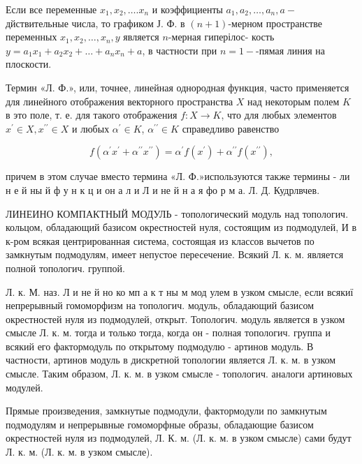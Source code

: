 \documentclass[10pt]{article}
\begin{document}
Если все переменные $x_{1}, x_{2}, \ldots . x_{n}$ и коэффициенты $a_{1}, a_{2}, \ldots, a_{n}, a-$ дйствительные числа, то графиком Ј. Ф. в $(n+1)$-мерном пространстве переменных $x_{1}, x_{2}, \ldots, x_{n}, y$ является $n$-мерная гиперілос- кость $y=a_{1} x_{1}+a_{2} x_{2}+\ldots+a_{n} x_{n}+a$, в частности при $n=1-$-пямая линия на плоскости.



Термин «Л. Ф.», или, точнее, линейная однородная функция, часто применяется для линейного отображения векторного пространства $X$ над некоторым полем $K$ в это поле, т. е. для такого отображения $f: X \rightarrow K$, что для любых элементов $x^{\prime} \in X, x^{\prime \prime} \in X$ и любых $\alpha^{\prime} \in K$, $\alpha^{\prime \prime} \in K$ справедливо равенство



\[

f\left(\alpha^{\prime} x^{\prime}+\alpha^{\prime \prime} x^{\prime \prime}\right)=\alpha^{\prime} f\left(x^{\prime}\right)+\alpha^{\prime \prime} f\left(x^{\prime \prime}\right),

\]



причем в этом случае вместо термина «Л. Ф.»используются также термины - ли н е й ны й ф у н к ц и он а л и Л и не й н а я фо р м а. Л. Д. Кудрлвчев.



ЛИНЕИНО КОМПАКТНЫЙ МОДУЛЬ - топологический модуль над топологич. кольцом, обладающий базисом окрестностей нуля, состоящим из подмодулей, И в к-ром всякая центрированная система, состоящая из классов вычетов по замкнутым подмодулям, имеет непустое пересечение. Всякий Л. к. м. является полной топологич. группой.



Л. к. М. наз. Л и не й но ко мп а к т ны м мод улем в узком смысле, если всякиї непрерывный гомоморфизм на топологич. модуль, обладающий базисом окрестностей нуля из подмодулей, открыт. Топологич. модуль является в узком смысле Л. к. м. тогда и только тогда, когда он - полная топологич. группа и всякий его фактормодуль по открытому подмодулю - артинов модуль. В частности, артинов модуль в дискретной топологии является Л. к. м. в узком смысле. Таким образом, Л. к. м. в узком смысле - топологич. аналоги артиновых модулей.



Прямые произведения, замкнутые подмодули, фактормодули по замкнутым подмодулям и непрерывные гомоморфные образы, обладающие базисом окрестностей нуля из подмодулей, Л. К. м. (Л. к. м. в узком смысле) сами будут Л. к. м. (Л. к. м. в узком смысле).
\end{document}
